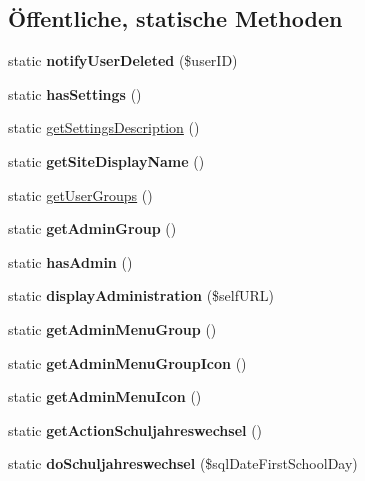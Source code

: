 \subsection*{Öffentliche, statische Methoden}
\begin{DoxyCompactItemize}
\item 
\mbox{\label{classklassenkalender_a617b8c34a9ac5ba541ec79a4b9881a20}} 
static {\bfseries notify\+User\+Deleted} (\$user\+ID)
\item 
\mbox{\label{classklassenkalender_a16cf8ab82815d25f2417a80f283c2a14}} 
static {\bfseries has\+Settings} ()
\item 
static \mbox{\hyperlink{classklassenkalender_a37e40b207b67a98131fbcc95f928b2f9}{get\+Settings\+Description}} ()
\item 
\mbox{\label{classklassenkalender_a5f460c193fdcb3985eb417b28c25e450}} 
static {\bfseries get\+Site\+Display\+Name} ()
\item 
static \mbox{\hyperlink{classklassenkalender_adc32be61b75209d170e29f990c104bcf}{get\+User\+Groups}} ()
\item 
\mbox{\label{classklassenkalender_a8f413eba6744371f9f506a22c1612158}} 
static {\bfseries get\+Admin\+Group} ()
\item 
\mbox{\label{classklassenkalender_a86fc6d13c8dbdf07eab443df713c46d8}} 
static {\bfseries has\+Admin} ()
\item 
\mbox{\label{classklassenkalender_ac1b2181ce823363da0c24ac1e280eb35}} 
static {\bfseries display\+Administration} (\$self\+U\+RL)
\item 
\mbox{\label{classklassenkalender_a589883b60dceb9e52f705df4141d2ba0}} 
static {\bfseries get\+Admin\+Menu\+Group} ()
\item 
\mbox{\label{classklassenkalender_a483b299ed3b2490985f1fdcb519028e8}} 
static {\bfseries get\+Admin\+Menu\+Group\+Icon} ()
\item 
\mbox{\label{classklassenkalender_a4896a1f1ccf27d19538012efa1eac414}} 
static {\bfseries get\+Admin\+Menu\+Icon} ()
\item 
\mbox{\label{classklassenkalender_ac744a502b42797b76208874f096a40ed}} 
static {\bfseries get\+Action\+Schuljahreswechsel} ()
\item 
\mbox{\label{classklassenkalender_a713d3619246dd97f46d7aa04420873b8}} 
static {\bfseries do\+Schuljahreswechsel} (\$sql\+Date\+First\+School\+Day)
\end{DoxyCompactItemize}
